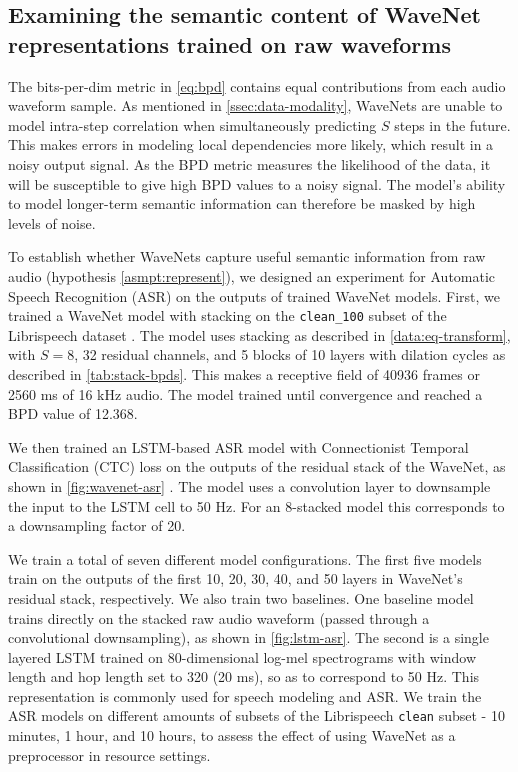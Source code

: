 \subsection{Examining the semantic content of WaveNet representations trained on raw waveforms}\label{ssec:results-asr}
The bits-per-dim metric in \cref{eq:bpd} contains equal contributions from each audio waveform sample. 
As mentioned in \cref{ssec:data-modality}, WaveNets are unable to model intra-step correlation when simultaneously predicting $S$ steps in the future. 
This makes errors in modeling local dependencies more likely, which result in a noisy output signal. 
As the BPD metric measures the likelihood of the data, it will be susceptible to give high BPD values to a noisy signal.
The model's ability to model longer-term semantic information can therefore be masked by high levels of noise.


To establish whether WaveNets capture useful semantic information from raw audio (hypothesis \ref{asmpt:represent}), we designed an experiment for Automatic Speech Recognition (ASR) on the outputs of trained WaveNet models.
First, we trained a WaveNet model with stacking on the \texttt{clean\_100} subset of the Librispeech dataset \cite{noauthor_librispeech_nodate}.
The model uses stacking as described in \cref{data:eq-transform}, with $S=8$, 32 residual channels, and 5 blocks of 10 layers with dilation cycles as described in \cref{tab:stack-bpds}. This makes a receptive field of 40936 frames or 2560 ms of 16 kHz audio. %
The model trained until convergence and reached a BPD value of 12.368. %

We then trained an LSTM-based ASR model with Connectionist Temporal Classification (CTC) loss on the outputs of the residual stack of the WaveNet, as shown in \cref{fig:wavenet-asr}
\cite{graves_connectionist_nodate, hochreiter_long_1997}.
The model uses a convolution layer to downsample the input to the LSTM cell to 50 Hz. 
For an 8-stacked model this corresponds to a downsampling factor of 20.

We train a total of seven different model configurations. 
The first five models train on the outputs of the first 10, 20, 30, 40, and 50 layers in WaveNet's residual stack, respectively. 
We also train two baselines. One baseline model trains directly on the stacked raw audio waveform (passed through a convolutional downsampling), as shown in \cref{fig:lstm-asr}.
The second is a single layered LSTM trained on 80-dimensional log-mel spectrograms with window length and hop length set to 320 (20 ms), so as to correspond to 50 Hz. This representation is commonly used for speech modeling and ASR.
We train the ASR models on different amounts of subsets of the Librispeech \texttt{clean} subset - 10 minutes, 1 hour, and 10 hours, to assess the effect of using WaveNet as a preprocessor in resource settings.


